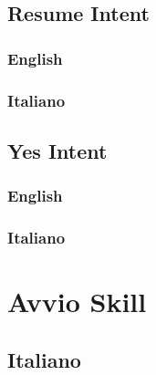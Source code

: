 \subsection{Resume Intent}
\subsubsection{English}
\begin{itemize}
	
	
\end{itemize}

\subsubsection{Italiano}
\begin{itemize}
	
\end{itemize}



\subsection{Yes Intent}
\subsubsection{English}
\begin{itemize}
	
	
\end{itemize}

\subsubsection{Italiano}
\begin{itemize}
\end{itemize}





\section{Avvio Skill}
\subsection{Italiano}





